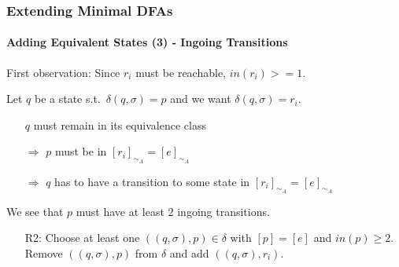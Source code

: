 \begin{frame}
	\frametitle{Extending Minimal DFAs}
	\framesubtitle{Adding Equivalent States (3) - Ingoing Transitions}
	
	First observation: Since $r_i$ must be reachable, $in(r_i) >= 1$.

	\vspace{0.2cm}
	Let $q$ be a state s.t.\ $\delta(q,\sigma)=p$ and we want $\delta(q,\sigma)=r_i$.\pause
	
	\vspace{0.2cm}
	\begin{itemize}
		\item[] $q$ must remain in its equivalence class\pause
		
		\item[$\Rightarrow$] $p$ must be in $[r_i]_{\sim_A} = [e]_{\sim_A}$\pause
		
		\item[$\Rightarrow$] $q$ has to have a transition to some state in $[r_i]_{\sim_A} = [e]_{\sim_A}$\pause
	\end{itemize}
	
	\vspace{0.2cm}
	We see that $p$ must have at least $2$ ingoing transitions.\pause
	
	\vspace{0.2cm}
	\begin{itemize}
		\item[R2:] Choose at least one $((q, \sigma), p) \in \delta$ with $[p] = [e]$ and $in(p) \geq 2$. Remove $((q, \sigma), p)$ from $\delta$ and add $((q, \sigma), r_i)$.
	\end{itemize}

\end{frame}

